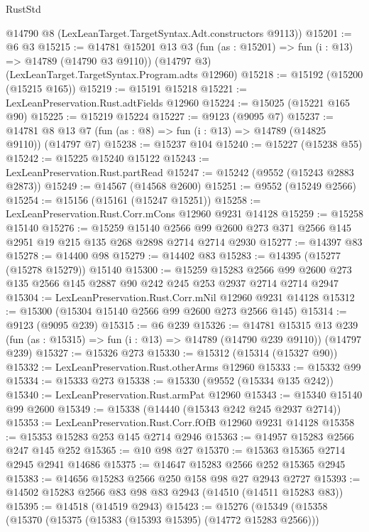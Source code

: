\begin{lexlean}{RustStd}
\begin{coremodule}
    @14790 @8 (LexLeanTarget.TargetSyntax.Adt.constructors @9113))
@15201 := @6 @3
@15215 := @14781
    @15201
    @13
    @3
    (fun (as : @15201) => fun (i : @13) => @14789 (@14790 @3 @9110))
    (@14797 @3)
    (LexLeanTarget.TargetSyntax.Program.adts @12960)
@15218 := @15192 (@15200 (@15215 @165))
@15219 := @15191 @15218
@15221 := LexLeanPreservation.Rust.adtFields @12960
@15224 := @15025 (@15221 @165 @90)
@15225 := @15219 @15224
@15227 := @9123 (@9095 @7)
@15237 := @14781 @8 @13 @7 (fun (as : @8) => fun (i : @13) => @14789 (@14825 @9110)) (@14797 @7)
@15238 := @15237 @104
@15240 := @15227 (@15238 @55)
@15242 := @15225 @15240 @15122
@15243 := LexLeanPreservation.Rust.partRead
@15247 := @15242 (@9552 (@15243 @2883 @2873))
@15249 := @14567 (@14568 @2600)
@15251 := @9552 (@15249 @2566)
@15254 := @15156 (@15161 (@15247 @15251))
@15258 := LexLeanPreservation.Rust.Corr.mCons @12960 @9231 @14128
@15259 := @15258 @15140
@15276 := @15259
    @15140
    @2566
    @99
    @2600
    @273
    @371
    @2566
    @145
    @2951
    @19
    @215
    @135
    @268
    @2898
    @2714
    @2714
    @2930
@15277 := @14397 @83
@15278 := @14400 @98
@15279 := @14402 @83
@15283 := @14395 (@15277 (@15278 @15279)) @15140
@15300 := @15259
    @15283
    @2566
    @99
    @2600
    @273
    @135
    @2566
    @145
    @2887
    @90
    @242
    @245
    @253
    @2937
    @2714
    @2714
    @2947
@15304 := LexLeanPreservation.Rust.Corr.mNil @12960 @9231 @14128
@15312 := @15300 (@15304 @15140 @2566 @99 @2600 @273 @2566 @145)
@15314 := @9123 (@9095 @239)
@15315 := @6 @239
@15326 := @14781
    @15315
    @13
    @239
    (fun (as : @15315) => fun (i : @13) => @14789 (@14790 @239 @9110))
    (@14797 @239)
@15327 := @15326 @273
@15330 := @15312 (@15314 (@15327 @90))
@15332 := LexLeanPreservation.Rust.otherArms @12960
@15333 := @15332 @99
@15334 := @15333 @273
@15338 := @15330 (@9552 (@15334 @135 @242))
@15340 := LexLeanPreservation.Rust.armPat @12960
@15343 := @15340 @15140 @99 @2600
@15349 := @15338 (@14440 (@15343 @242 @245 @2937 @2714))
@15353 := LexLeanPreservation.Rust.Corr.fOfB @12960 @9231 @14128
@15358 := @15353 @15283 @253 @145 @2714 @2946
@15363 := @14957 @15283 @2566 @247 @145 @252
@15365 := @10 @98 @27
@15370 := @15363 @15365 @2714 @2945 @2941 @14686
@15375 := @14647 @15283 @2566 @252 @15365 @2945
@15383 := @14656 @15283 @2566 @250 @158 @98 @27 @2943 @2727
@15393 := @14502 @15283 @2566 @83 @98 @83 @2943 (@14510 (@14511 @15283 @83))
@15395 := @14518 (@14519 @2943)
@15423 := @15276
    (@15349
      (@15358
        (@15370
          (@15375 (@15383 (@15393 @15395) (@14772 @15283 @2566)))

\end{coremodule}
\end{lexlean}
